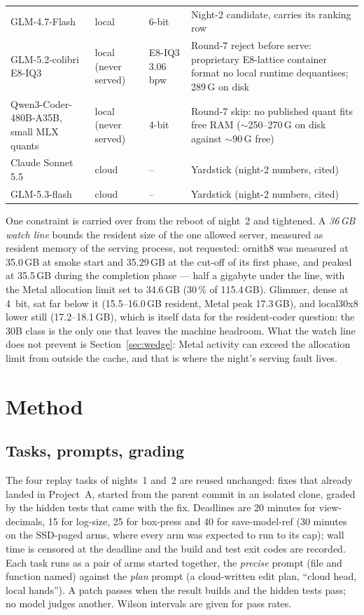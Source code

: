 \begin{table}[htbp]
\begin{tabular}{P{4.4cm}P{3.2cm}P{1.8cm}P{4.8cm}}
GLM-4.7-Flash \citep{Zhipu-AI-2026aa} & local & 6-bit & Night-2 candidate, carries its ranking row \\
GLM-5.2-colibri E8-IQ3 & local (never served) & E8-IQ3 3.06\,bpw & Round-7 reject before serve: proprietary E8-lattice container format no local runtime dequantises; 289\,G on disk \\
Qwen3-Coder-480B-A35B, small MLX quants & local (never served) & 4-bit & Round-7 skip: no published quant fits free RAM (${\sim}$250--270\,G on disk against ${\sim}$90\,G free) \\
Claude Sonnet 5.5 \citep{Anthropic-2026ab} & cloud & -- & Yardstick (night-2 numbers, cited) \\
GLM-5.3-flash & cloud & -- & Yardstick (night-2 numbers, cited) \\
\bottomrule
\end{tabular}
\end{table}

One constraint is carried over from the reboot of night~2 and tightened. A \emph{36\,GB watch line} bounds the
resident size of the one allowed server, measured as resident memory of the serving process, not requested:
ornith8 was measured at 35.0\,GB at smoke start and 35.29\,GB at the cut-off of its first phase, and peaked at
35.5\,GB during the completion phase --- half a gigabyte under the line, with the Metal allocation limit set to
34.6\,GB (30\,\% of 115.4\,GB). Glimmer, dense at 4~bit, sat far below it (15.5--16.0\,GB resident, Metal peak
17.3\,GB), and local30x8 lower still (17.2--18.1\,GB), which is itself data for the resident-coder question: the
30B class is the only one that leaves the machine headroom. What the watch line does not prevent is
Section~\ref{sec:wedge}: Metal activity can exceed the allocation limit from outside the cache, and that is where
the night's serving fault lives.

\section{Method}\label{sec:method}

\subsection{Tasks, prompts, grading}

The four replay tasks of nights~1 and~2 are reused unchanged: fixes that already landed in Project~A, started from
the parent commit in an isolated clone, graded by the hidden tests that came with the fix. Deadlines are 20
minutes for view-decimals, 15 for log-size, 25 for box-press and 40 for save-model-ref (30 minutes on the
SSD-paged arms, where every arm was expected to run to its cap); wall time is censored at the deadline and the
build and test exit codes are recorded. Each task runs as a pair of arms started together, the \emph{precise}
prompt (file and function named) against the \emph{plan} prompt (a cloud-written edit plan, ``cloud head, local
hands''). A patch passes when the result builds and the hidden tests pass; no model judges another. Wilson
intervals \citep{Wilson-1927aa} are given for pass rates.

